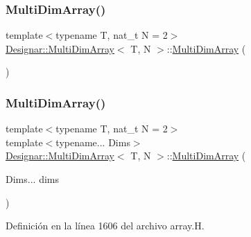 \subsubsection{\texorpdfstring{Multi\+Dim\+Array()}{MultiDimArray()}\hspace{0.1cm}{\footnotesize\ttfamily [1/4]}}
{\footnotesize\ttfamily template$<$typename T, nat\+\_\+t N = 2$>$ \\
\hyperlink{class_designar_1_1_multi_dim_array}{Designar\+::\+Multi\+Dim\+Array}$<$ T, N $>$\+::\hyperlink{class_designar_1_1_multi_dim_array}{Multi\+Dim\+Array} (\begin{DoxyParamCaption}{ }\end{DoxyParamCaption})\hspace{0.3cm}{\ttfamily [default]}}

\mbox{\label{class_designar_1_1_multi_dim_array_a87e9b411cccc10d39117d1ccdcd66261}} 
\subsubsection{\texorpdfstring{Multi\+Dim\+Array()}{MultiDimArray()}\hspace{0.1cm}{\footnotesize\ttfamily [2/4]}}
{\footnotesize\ttfamily template$<$typename T, nat\+\_\+t N = 2$>$ \\
template$<$typename... Dims$>$ \\
\hyperlink{class_designar_1_1_multi_dim_array}{Designar\+::\+Multi\+Dim\+Array}$<$ T, N $>$\+::\hyperlink{class_designar_1_1_multi_dim_array}{Multi\+Dim\+Array} (\begin{DoxyParamCaption}\item[{Dims...}]{dims }\end{DoxyParamCaption})\hspace{0.3cm}{\ttfamily [inline]}}



Definición en la línea 1606 del archivo array.\+H.

\mbox{\label{class_designar_1_1_multi_dim_array_a4dd6166b45028efc4bab7cd42c492663}} 
